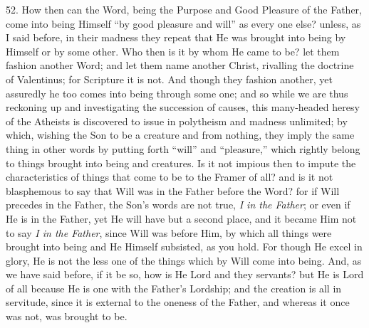 52. How then can the Word,
being the Purpose and Good Pleasure of the Father, come into being
Himself ``by good pleasure and will'' as every one else? unless, as I
said before, in their madness they repeat that He was brought into
being by Himself or by some other. Who then is it by whom He came to
be? let them fashion another Word; and let them name another Christ,
rivalling the doctrine of Valentinus; for Scripture it is not. And
though they fashion another, yet assuredly he too comes into being
through some one; and so while we are thus reckoning up and
investigating the succession of causes, this many-headed heresy of the
Atheists is discovered to issue in polytheism and madness unlimited;
by which, wishing the Son to be a creature and from nothing, they
imply the same thing in other words by putting forth ``will'' and ``pleasure,''
which rightly belong to things brought into being and creatures. Is it
not impious then to impute the characteristics of things that come to
be to the Framer of all? and is it not blasphemous to say that Will
was in the Father before the Word? for if Will precedes in the Father,
the Son's words are not true, \emph{I in the Father}; or even if He is
in the Father, yet He will have but a second place, and it became Him
not to say \emph{I in the Father}, since Will was before Him, by which
all things were brought into being and He Himself subsisted, as you
hold. For though He excel in glory, He is not the less one of
the things which by Will come into being. And, as we have said before,
if it be so, how is He Lord and they servants? but He is Lord of all
because He is one with the Father's Lordship; and the creation is all
in servitude, since it is external to the oneness of the Father, and
whereas it once was not, was brought to be.

